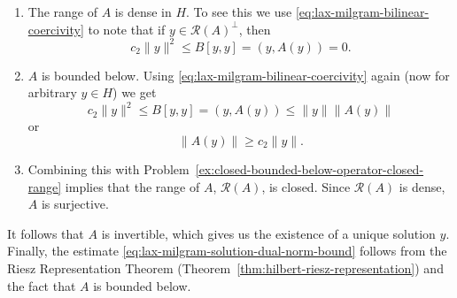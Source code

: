 \begin{Proof}
\begin{enumerate}
\begin{equation}
\|A(y)\|^2=(A(y),A(y))=B[A(y),y]\leq c_1\|A(y)\|\|y\|.
\end{equation}
Canceling, we get
\begin{equation}\label{eq:lax-milgram-associated-operator-upper-bound}
\|A(y)\|\leq c_1\|y\|.
\end{equation}
\item The range of $A$ is dense in $H$. To see this we use \eqref{eq:lax-milgram-bilinear-coercivity} to note that if $y\in\mathcal{R}(A)^\perp$, then
\begin{equation}\label{eq:lax-milgram-associated-operator-range-dense}
c_2\|y\|^2\leq B[y,y]=(y,A(y))=0.
\end{equation}
\item $A$ is bounded below. Using \eqref{eq:lax-milgram-bilinear-coercivity} again (now for arbitrary $y\in H$) we get
\begin{equation}\label{eq:lax-milgram-associated-operator-lower-calculation}
c_2\|y\|^2\leq B[y,y]=(y,A(y))\leq\|y\|\|A(y)\|
\end{equation}
or
\begin{equation}\label{eq:lax-milgram-associated-operator-bounded-below}
\|A(y)\|\geq c_2\|y\|.
\end{equation}
\item Combining this with Problem~\ref{ex:closed-bounded-below-operator-closed-range} implies that the range of $A$, $\mathcal{R}(A)$, is closed. Since $\mathcal{R}(A)$ is dense, $A$ is surjective.\end{enumerate}It follows that $A$ is invertible, which gives us the existence of a unique solution $y$. Finally, the estimate \eqref{eq:lax-milgram-solution-dual-norm-bound} follows from the Riesz Representation Theorem (Theorem~\ref{thm:hilbert-riesz-representation}) and the fact that $A$ is bounded below.
\end{Proof}
